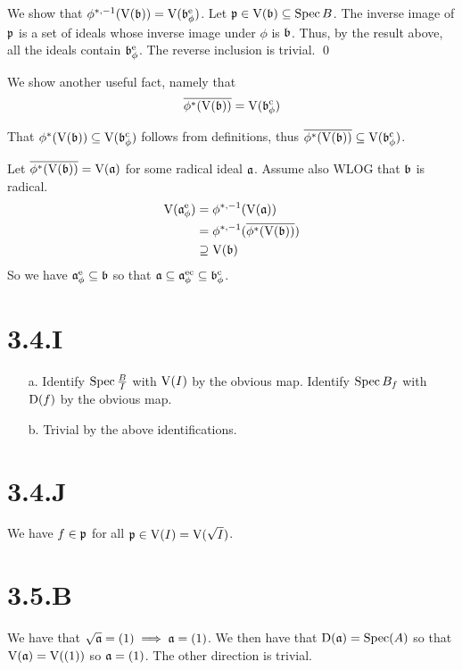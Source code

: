 \documentclass{article}
\begin{document}
We show that $\phi^{*,-1}(\operatorname{V}(\mathfrak{b}))=\operatorname{V}(\mathfrak{b}_\phi^{\text{e}})$. Let $\mathfrak{p} \in \operatorname{V}(\mathfrak{b}) \subseteq \operatorname{Spec}{B}$. The inverse image of $\mathfrak{p}$ is a set of ideals whose inverse image under $\phi$ is $\mathfrak{b}$. Thus, by the result above, all the ideals contain $\mathfrak{b}_\phi^{\text{e}}$. The reverse inclusion is trivial. \qed

We show another useful fact, namely that
\begin{equation*}
    \overline{\phi^*(\operatorname{V}(\mathfrak{b}))}=\operatorname{V}(\mathfrak{b}^{\text{c}}_\phi)
\end{equation*}

That $\phi^*(\operatorname{V}(\mathfrak{b})) \subseteq \operatorname{V}(\mathfrak{b}^{\text{c}}_\phi)$ follows from definitions, thus $\overline{\phi^*(\operatorname{V}(\mathfrak{b}))} \subseteq \operatorname{V}(\mathfrak{b}^{\text{c}}_\phi)$.

Let $\overline{\phi^*(\operatorname{V}(\mathfrak{b}))}=\operatorname{V}(\mathfrak{a})$ for some radical ideal $\mathfrak{a}$. Assume also WLOG that $\mathfrak{b}$ is radical.
\begin{align*}
    \operatorname{V}(\mathfrak{a}^\text{e}_\phi) & =\phi^{*,-1}(\operatorname{V}(\mathfrak{a}))                     \\
                          & = \phi^{*,-1}(\overline{\phi^*(\operatorname{V}(\mathfrak{b}))}) \\
                          & \supseteq \operatorname{V}(\mathfrak{b})
\end{align*}
So we have $\mathfrak{a}^{\text{e}}_\phi \subseteq \mathfrak{b}$ so that $\mathfrak{a} \subseteq \mathfrak{a}^{\text{ec}}_\phi \subseteq \mathfrak{b}^{\text{c}}_\phi$.

\section{3.4.I}
\begin{itemize}
    \item [a.] Identify $\operatorname{Spec}\frac{B}{I}$ with $\operatorname{V}(I)$ by the obvious map. Identify $\operatorname{Spec} B_f$ with $\operatorname{D}(f)$ by the obvious map.
    \item [b.] Trivial by the above identifications.
\end{itemize}

\section{3.4.J}
We have $f \in \mathfrak{p}$ for all $\mathfrak{p} \in \operatorname{V}(I) = \operatorname{V}(\sqrt{I})$.

\section{3.5.B}
We have that $\sqrt{\mathfrak{a}}=(1) \implies \mathfrak{a}=(1)$. We then have that $\operatorname{D}(\mathfrak{a})=\operatorname{Spec}(A)$ so that $\operatorname{V}(\mathfrak{a})=\operatorname{V}((1))$ so $\mathfrak{a}=(1)$. The other direction is trivial.
\end{document}
